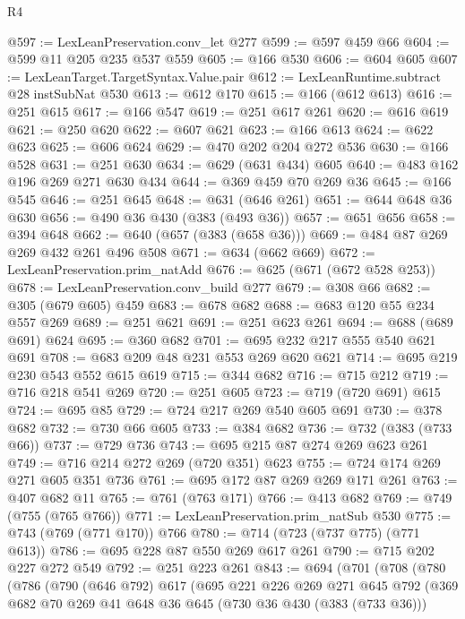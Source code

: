 \begin{lexlean}{R4}
\begin{coremodule}
{{{{{{{{{{{{{{@597 := LexLeanPreservation.conv_let @277
@599 := @597 @459 @66
@604 := @599 @11 @205 @235 @537 @559
@605 := @166 @530
@606 := @604 @605
@607 := LexLeanTarget.TargetSyntax.Value.pair
@612 := LexLeanRuntime.subtract @28 instSubNat @530
@613 := @612 @170
@615 := @166 (@612 @613)
@616 := @251 @615
@617 := @166 @547
@619 := @251 @617 @261
@620 := @616 @619
@621 := @250 @620
@622 := @607 @621
@623 := @166 @613
@624 := @622 @623
@625 := @606 @624
@629 := @470 @202 @204 @272 @536
@630 := @166 @528
@631 := @251 @630
@634 := @629 (@631 @434) @605
@640 := @483 @162 @196 @269 @271 @630 @434
@644 := @369 @459 @70 @269 @36
@645 := @166 @545
@646 := @251 @645
@648 := @631 (@646 @261)
@651 := @644 @648 @36 @630
@656 := @490 @36 @430 (@383 (@493 @36))
@657 := @651 @656
@658 := @394 @648
@662 := @640 (@657 (@383 (@658 @36)))
@669 := @484 @87 @269 @269 @432 @261 @496 @508
@671 := @634 (@662 @669)
@672 := LexLeanPreservation.prim_natAdd
@676 := @625 (@671 (@672 @528 @253))
@678 := LexLeanPreservation.conv_build @277
@679 := @308 @66
@682 := @305 (@679 @605) @459
@683 := @678 @682
@688 := @683 @120 @55 @234 @557 @269
@689 := @251 @621
@691 := @251 @623 @261
@694 := @688 (@689 @691) @624
@695 := @360 @682
@701 := @695 @232 @217 @555 @540 @621 @691
@708 := @683 @209 @48 @231 @553 @269 @620 @621
@714 := @695 @219 @230 @543 @552 @615 @619
@715 := @344 @682
@716 := @715 @212
@719 := @716 @218 @541 @269
@720 := @251 @605
@723 := @719 (@720 @691) @615
@724 := @695 @85
@729 := @724 @217 @269 @540 @605 @691
@730 := @378 @682
@732 := @730 @66 @605
@733 := @384 @682
@736 := @732 (@383 (@733 @66))
@737 := @729 @736
@743 := @695 @215 @87 @274 @269 @623 @261
@749 := @716 @214 @272 @269 (@720 @351) @623
@755 := @724 @174 @269 @271 @605 @351 @736
@761 := @695 @172 @87 @269 @269 @171 @261
@763 := @407 @682 @11
@765 := @761 (@763 @171)
@766 := @413 @682
@769 := @749 (@755 (@765 @766))
@771 := LexLeanPreservation.prim_natSub @530
@775 := @743 (@769 (@771 @170)) @766
@780 := @714 (@723 (@737 @775) (@771 @613))
@786 := @695 @228 @87 @550 @269 @617 @261
@790 := @715 @202 @227 @272 @549
@792 := @251 @223 @261
@843 := @694
    (@701
      (@708
        (@780
          (@786
            (@790
              (@646 @792)
              @617
              (@695
                @221
                @226
                @269
                @271
                @645
                @792
                (@369
                  @682
                  @70
                  @269
                  @41
                  @648
                  @36
                  @645
                  (@730 @36 @430 (@383 (@733 @36)))
}}}}}}}}}}}}}}
\end{coremodule}
\end{lexlean}
